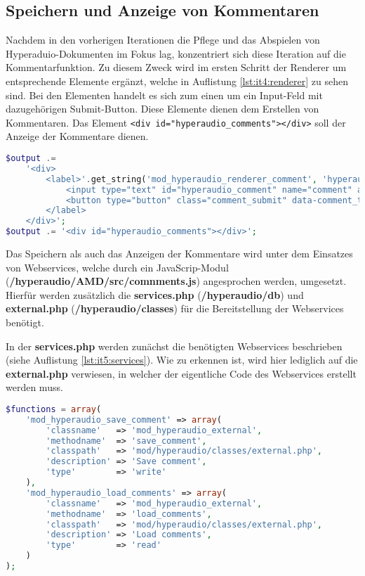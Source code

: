 \subsection{Speichern und Anzeige von Kommentaren}
Nachdem in den vorherigen Iterationen die Pflege und das Abspielen von Hyperaduio-Dokumenten im Fokus lag, konzentriert sich diese Iteration auf die Kommentarfunktion. Zu diesem Zweck wird im ersten Schritt der Renderer um entsprechende Elemente ergänzt, welche in Auflistung \ref{lst:it4:renderer} zu sehen sind. Bei den Elementen handelt es sich zum einen um ein Input-Feld mit dazugehörigen Submit-Button. Diese Elemente dienen dem Erstellen von Kommentaren. Das Element \texttt{<div id="hyperaudio_comments"></div>} soll der Anzeige der Kommentare dienen.

\begin{lstlisting}[language=php,
             linewidth=\textwidth,
             caption={Ausschnitt der \textbf{renderer.php} in der 4. Iteration},
             label={lst:it4:renderer}]
$output .=
	'<div>
		<label>'.get_string('mod_hyperaudio_renderer_comment', 'hyperaudio').':
			<input type="text" id="hyperaudio_comment" name="comment" autocomplete="off"/>
			<button type="button" class="comment_submit" data-comment_type="'.CommentType::Comment.'">'.get_string('mod_hyperaudio_renderer_submit_comment', 'hyperaudio').'</button>
		</label>
	</div>';
$output .= '<div id="hyperaudio_comments"></div>';
\end{lstlisting}

Das Speichern als auch das Anzeigen der Kommentare wird unter dem Einsatzes von Webservices, welche durch ein JavaScrip-Modul (\textbf{/hyperaudio/AMD/src/comnments.js}) angesprochen werden, umgesetzt. Hierfür werden zusätzlich die \textbf{services.php} (\textbf{/hyperaudio/db}) und \textbf{external.php} (\textbf{/hyperaudio/classes}) für die Bereitstellung der Webservices benötigt.

In der \textbf{services.php} werden zunächst die benötigten Webservices beschrieben (siehe Auflistung \ref{lst:it5:services}). Wie zu erkennen ist, wird hier lediglich auf die \textbf{external.php} verwiesen, in welcher der eigentliche Code des Webservices erstellt werden muss.

\begin{lstlisting}[language=php,
             linewidth=\textwidth,
             caption={\textbf{services.php} in der 5. Iteration},
             label={lst:it5:services}]
$functions = array(
	'mod_hyperaudio_save_comment' => array(
		'classname'   => 'mod_hyperaudio_external',
		'methodname'  => 'save_comment',
		'classpath'   => 'mod/hyperaudio/classes/external.php',
		'description' => 'Save comment',
		'type'        => 'write'
	),
	'mod_hyperaudio_load_comments' => array(
		'classname'   => 'mod_hyperaudio_external',
		'methodname'  => 'load_comments',
		'classpath'   => 'mod/hyperaudio/classes/external.php',
		'description' => 'Load comments',
		'type'        => 'read'
	)
);
\end{lstlisting}

